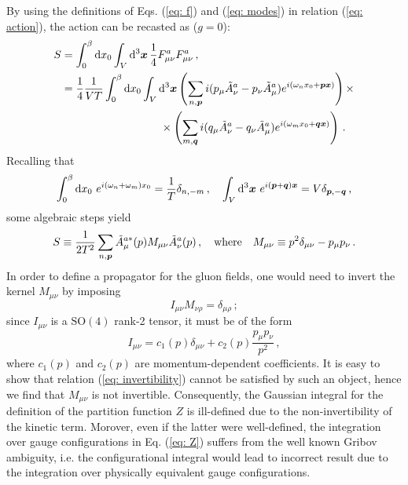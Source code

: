 \documentclass{article}
\begin{document}
By using the definitions of Eqs. (\ref{eq: f}) and (\ref{eq: modes}) in relation (\ref{eq: action}), the action can be recasted as ($g = 0$):
\begin{align*}
    S &= \int_{0}^{\beta} \dd{x_0} \int_V \dd[3]{\vb*{x}} \frac{1}{4} F_{\mu\nu}^a F_{\mu\nu}^a \, , \\
      &= \frac{1}{4} \frac{1}{VT} \int_{0}^{\beta} \dd{x_0} \int_V \dd[3]{\vb*{x}} \left(\sum_{n, \vb*{p}} i (p_\mu \tilde{A}_\nu^a - p_\nu \tilde{A}_\mu^a ) e^{i(\omega_n x_0 + \vb*{p} \vb*{x})} \right) \times \\
      &\qquad \qquad \qquad \qquad \quad \times \left(\sum_{m, \vb*{q}} i (q_\mu \tilde{A}_\nu^a - q_\nu \tilde{A}_\mu^a ) e^{i(\omega_m x_0 + \vb*{q} \vb*{x})} \right) \, .
\end{align*}
Recalling that
\begin{equation}
    \int_{0}^{\beta} \dd{x_0} \, e^{i(\omega_n + \omega_m)x_0} = \frac{1}{T} \delta_{n, -m} \, , \quad \int_V \dd[3]{\vb*{x}} \, e^{i(\vb*{p} + \vb*{q})\vb*{x}} = V \delta_{\vb*{p}, -\vb*{q}} \, ,
\end{equation}
some algebraic steps yield
\begin{equation}
    S \equiv \frac{1}{2T^2} \sum_{n, \vb*{p}} \tilde{A}_\mu^{a *} (p) M_{\mu\nu} \tilde{A}_\nu^{a}(p) \, , \quad \text{where} \quad M_{\mu \nu} \equiv p^2 \delta_{\mu \nu} - p_\mu p_\nu \, .
\end{equation}
In order to define a propagator for the gluon fields, one would need to invert the kernel $M_{\mu\nu}$ by imposing
\begin{equation}\label{eq: invertibility}
    I_{\mu\nu} M_{\nu\rho} = \delta_{\mu \rho} \, ;
\end{equation}
since $I_{\mu\nu}$ is a $\mathrm{SO}(4)$ rank-2 tensor, it must be of the form
\begin{equation}
    I_{\mu\nu} = c_1(p) \delta_{\mu\nu} + c_2(p) \frac{p_\mu p_\nu}{p^2} \, ,  
\end{equation}
where $c_1(p)$ and $c_2(p)$ are momentum-dependent coefficients. It is easy to show that relation (\ref*{eq: invertibility}) cannot be satisfied by such an object, hence we find that $M_{\mu\nu}$ is not invertible.
Consequently, the Gaussian integral for the definition of the partition function $Z$ is ill-defined due to the non-invertibility of the kinetic term.
Morover, even if the latter were well-defined, the integration over gauge configurations in Eq. (\ref*{eq: Z}) suffers from the well known Gribov ambiguity, i.e. the configurational integral would lead to incorrect result due to the 
integration over physically equivalent gauge configurations.
\end{document}
